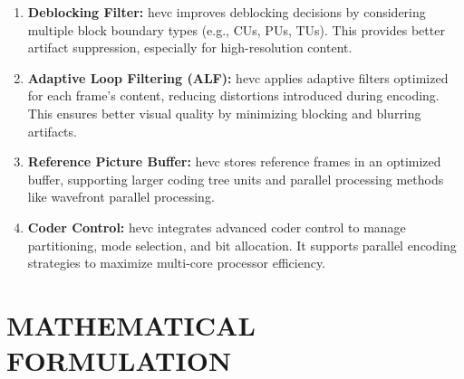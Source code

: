 \documentclass{ioereport}
\begin{document}
\begin{enumerate}[label=\textbf{\roman*.}]
        \item \textbf{Deblocking Filter:}  
        \gls{hevc} improves deblocking decisions by considering multiple block boundary types (e.g., CUs, PUs, TUs). This provides better artifact suppression, especially for high-resolution content.
    
        \item \textbf{Adaptive Loop Filtering (ALF):}  
        \gls{hevc} applies adaptive filters optimized for each frame's content, reducing distortions introduced during encoding. This ensures better visual quality by minimizing blocking and blurring artifacts.
    
        \item \textbf{Reference Picture Buffer:}  
        \gls{hevc} stores reference frames in an optimized buffer, supporting larger coding tree units and parallel processing methods like wavefront parallel processing.
    
        \item \textbf{Coder Control:}  
        \gls{hevc} integrates advanced coder control to manage partitioning, mode selection, and bit allocation. It supports parallel encoding strategies to maximize multi-core processor efficiency.
    \end{enumerate}


\pagebreak



\section{\MakeUppercase{Mathematical Formulation}}
\end{document}
